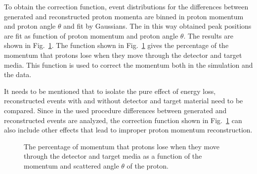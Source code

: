 To obtain the correction function, event distributions for the differences between generated
and reconstructed proton momenta are binned in proton momentum and proton angle $\theta$ and fit by Gaussians. The in this way obtained peak positions are fit as function of proton momentum and proton angle $\theta$.
The results are shown in Fig.~\ref{fig:eloss}. The function shown in Fig.~\ref{fig:eloss} gives the percentage of  the momentum that protons lose when they move through the detector and target media.
This function is used to correct the momentum both in the simulation and the data.

It needs to be mentioned that to isolate the pure effect of energy loss, reconstructed events with and without detector and target material need to be compared. Since in the used procedure differences between generated and reconstructed events are analyzed, the correction function shown in Fig.~\ref{fig:eloss} can also include other effects that lead to improper proton momentum reconstruction.

\begin{figure}[htp]
\begin{center}
\caption{\small The percentage of momentum that protons lose when they move through the detector and target media as a function of the momentum and scattered angle $\theta$ of the proton. \label{fig:eloss}} 
\end{center}
\end{figure}
